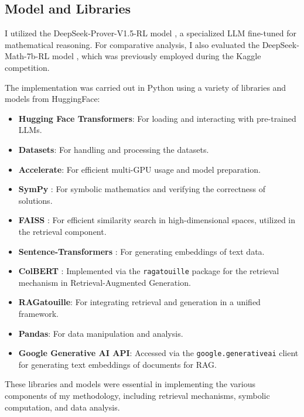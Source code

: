 \documentclass[11pt,a4paper]{article}
\begin{document}
\subsection{Model and Libraries}

I utilized the DeepSeek-Prover-V1.5-RL model \cite{xin2024deepseekproverv15harnessingproofassistant}, a specialized LLM fine-tuned for mathematical reasoning. For comparative analysis, I also evaluated the DeepSeek-Math-7b-RL model \cite{shao2024deepseekmathpushinglimitsmathematical}, which was previously employed during the Kaggle competition.

The implementation was carried out in Python using a variety of libraries and models from HuggingFace:

\begin{itemize}[noitemsep,nolistsep]
    \item \textbf{Hugging Face Transformers}: For loading and interacting with pre-trained LLMs.
    \item \textbf{Datasets}: For handling and processing the datasets.
    \item \textbf{Accelerate}: For efficient multi-GPU usage and model preparation.
    \item \textbf{SymPy} \cite{meurer2017sympy}: For symbolic mathematics and verifying the correctness of solutions.
    \item \textbf{FAISS} \cite{johnson2019billion}: For efficient similarity search in high-dimensional spaces, utilized in the retrieval component.
    \item \textbf{Sentence-Transformers} \cite{reimers2019sentencebertsentenceembeddingsusing}: For generating embeddings of text data.
    \item \textbf{ColBERT} \cite{khattab2020colbert}: Implemented via the \texttt{ragatouille} package for the retrieval mechanism in Retrieval-Augmented Generation.
    \item \textbf{RAGatouille}: For integrating retrieval and generation in a unified framework.
    \item \textbf{Pandas}: For data manipulation and analysis.
    \item \textbf{Google Generative AI API}: Accessed via the \texttt{google.generativeai} client for generating text embeddings of documents for RAG.
\end{itemize}

These libraries and models were essential in implementing the various components of my methodology, including retrieval mechanisms, symbolic computation, and data analysis.
\end{document}
